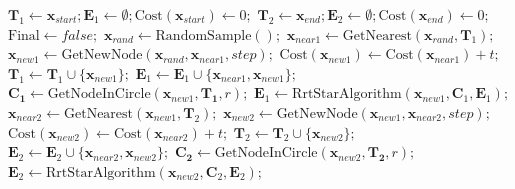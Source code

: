 \begin{algorithm}
    \caption{C-RRT*算法}
    \label{C-RRT*算法}
    \begin{algorithmic}[1]
        \setlength{\baselineskip}{16pt}
        \State $\boldsymbol{T}_1\leftarrow\boldsymbol{x}_{start};\boldsymbol{E}_1\leftarrow\emptyset; \text{Cost}(\boldsymbol{x}_{start}) \gets 0;$
        \State $\boldsymbol{T}_2\leftarrow\boldsymbol{x}_{end};\boldsymbol{E}_2\leftarrow\emptyset; \text{Cost}(\boldsymbol{x}_{end}) \gets 0;$
        \State $\text{Final} \gets false ;$
            \State $\boldsymbol{x}_{rand}\gets\text{RandomSample}();$
            \State $\boldsymbol{x}_{near1}\gets\text{GetNearest}(\boldsymbol{x}_{rand},\boldsymbol{T}_1);$
            \State $\boldsymbol{x}_{new1}\gets\text{GetNewNode}(\boldsymbol{x}_{rand},\boldsymbol{x}_{near1},step);$
                \State $\text{Cost}(\boldsymbol{x}_{new1})\gets\text{Cost}(\boldsymbol{x}_{near1}) + t ;$
                \State $\boldsymbol{T}_1\leftarrow \boldsymbol{T}_1\cup\{\boldsymbol{x}_{new1}\};$
                $\boldsymbol{E}_1\leftarrow \boldsymbol{E}_1\cup\{\boldsymbol{x}_{near1},\boldsymbol{x}_{new1}\};$
                \State $\boldsymbol{C_1}\gets\text{GetNodeInCircle}(\boldsymbol{x}_{new1},\boldsymbol{T_1},r);$
                    \State $\boldsymbol{E}_1\leftarrow \text{RrtStarAlgorithm}(\boldsymbol{x}_{new1},\boldsymbol{C}_1,\boldsymbol{E}_1);$
                \EndIf
                \State $\boldsymbol{x}_{near2}\gets\text{GetNearest}(\boldsymbol{x}_{new1},\boldsymbol{T}_2);$
                \State $\boldsymbol{x}_{new2}\gets\text{GetNewNode}(\boldsymbol{x}_{new1},\boldsymbol{x}_{near2},step);$
                \State $\text{Cost}(\boldsymbol{x}_{new2})\gets\text{Cost}(\boldsymbol{x}_{near2}) + t ;$
                \State $\boldsymbol{T}_2\leftarrow \boldsymbol{T}_2\cup\{\boldsymbol{x}_{new2}\};$
                $\boldsymbol{E}_2\leftarrow \boldsymbol{E}_2\cup\{\boldsymbol{x}_{near2},\boldsymbol{x}_{new2}\};$
                \State $\boldsymbol{C_2}\gets\text{GetNodeInCircle}(\boldsymbol{x}_{new2},\boldsymbol{T_2},r);$
                    \State $\boldsymbol{E}_2\leftarrow \text{RrtStarAlgorithm}(\boldsymbol{x}_{new2},\boldsymbol{C}_2,\boldsymbol{E}_2);$
                \EndIf

\end{algorithmic}
\end{algorithm}
